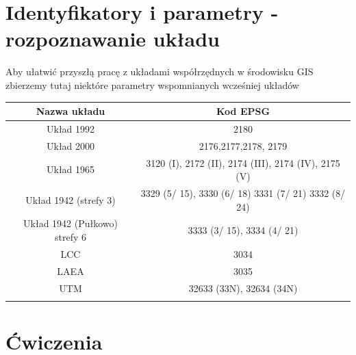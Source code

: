 \documentclass[a4paper,11pt, onecolumn, openany]{memoir}
\begin{document}
		\section{Identyfikatory i parametry - rozpoznawanie układu}	
			Aby ułatwić przyszłą pracę z układami współrzędnych w środowisku GIS zbierzemy tutaj niektóre parametry wspomnianych wcześniej układów\\
			\begin{tabular}{|c|c|}
				\hline
				Nazwa układu & Kod EPSG \\
				\hline
				Układ 1992 & 2180 \\
				\hline
				Układ 2000 & 2176,2177,2178, 2179 \\
				\hline
				Układ 1965&  3120 (I), 2172 (II), 2174 (III), 2174 (IV), 2175 (V)\\
				\hline
				Układ 1942 (strefy 3\degree)& 3329 (5/ 15\degree), 3330 (6/ 18\degree) 3331 (7/ 21\degree) 3332 (8/ 24\degree) \\
				\hline
				Układ 1942 (Pułkowo) strefy 6\degree& 3333 (3/ 15\degree), 3334 (4/ 21\degree) \\
				\hline
				LCC & 3034 \\
				\hline
				LAEA & 3035 \\
				\hline
				UTM & 32633 (33N), 32634 (34N)  \\
				\hline
				&  \\
				\hline
			\end{tabular}

		\section{Ćwiczenia}
\end{document}
